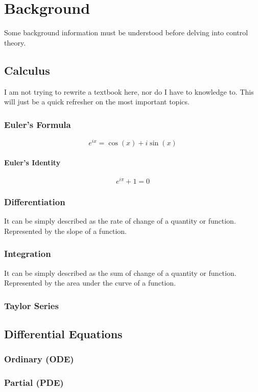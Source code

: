 \documentclass[../notes.tex]{subfiles}
\begin{document}
\section{Background}
Some background information must be understood before delving into control theory.
\subsection{Calculus}
I am not trying to rewrite a textbook here, nor do I have to knowledge to. This will just be a quick refresher on the most important topics.
\subsubsection{Euler's Formula}
\begin{equation} \label{eq:euler_form}
    e^{ix} = \cos(x) + i\sin(x)
\end{equation}
\paragraph{Euler's Identity}
\begin{equation} \label{eq:euler_id}
    e^{i \pi} + 1 = 0
\end{equation}
\subsubsection{Differentiation}
It can be simply described as the rate of change of a quantity or function. Represented by the slope of a function.
\subsubsection{Integration}
It can be simply described as the sum of change of a quantity or function. Represented by the area under the curve of a function.

\subsubsection{Taylor Series}

\subsection{Differential Equations}
\subsubsection{Ordinary (ODE)}
\subsubsection{Partial (PDE)}
\end{document}
